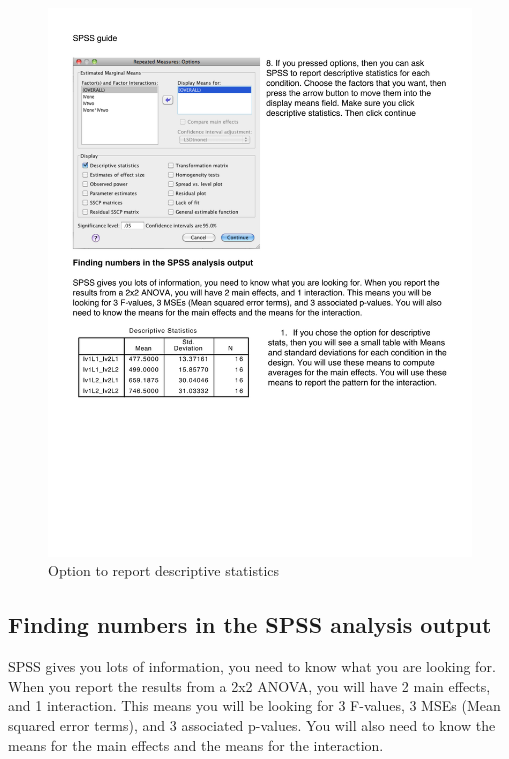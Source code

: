 \begin{figure}
      \includegraphics[width=\linewidth]{LabmanualFigures/SPSS11.pdf}
      \caption{Option to report descriptive statistics}
      \label{fig:SPSS11}
\end{figure}

\subsection{Finding numbers in the SPSS analysis output}

SPSS gives you lots of information, you need to know what you are looking for. When you report the results from a 2x2 ANOVA, you will have 2 main effects, and 1 interaction. This means you will be looking for 3 F-values, 3 MSEs (Mean squared error terms), and 3 associated p-values. You will also need to know the means for the main effects and the means for the interaction.

